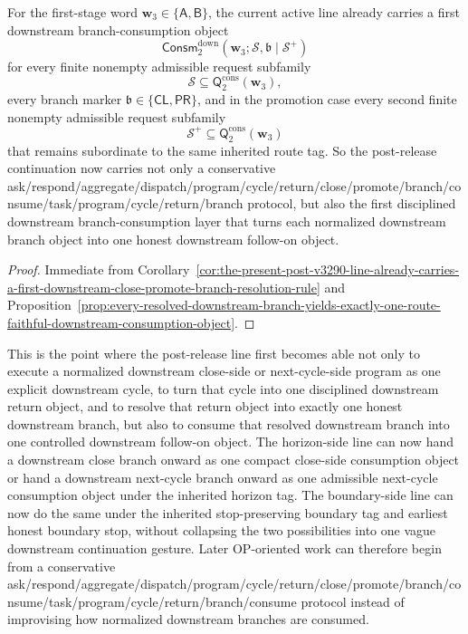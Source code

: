 \begin{corollary}
\label{cor:the-present-post-v3290-line-already-carries-a-first-downstream-branch-consumption-layer-second-level}
For the first-stage word \(\mathbf w_3\in\{\mathsf A,\mathsf B\}\), the current active line already carries a first downstream branch-consumption object
\[
  \mathsf{Consm}^{\mathrm{down}}_{2}(\mathbf w_3;\mathcal S,\mathfrak b\mid\mathcal S^{+})
\]
for every finite nonempty admissible request subfamily
\[
  \mathcal S\subseteq \mathsf{Q}^{\mathrm{cons}}_{2}(\mathbf w_3),
\]
every branch marker \(\mathfrak b\in\{\mathsf{CL},\mathsf{PR}\}\), and in the promotion case every second finite nonempty admissible request subfamily
\[
  \mathcal S^{+}\subseteq \mathsf{Q}^{\mathrm{cons}}_{2}(\mathbf w_3)
\]
that remains subordinate to the same inherited route tag. So the post-release continuation now carries not only a conservative ask/respond/aggregate/dispatch/program/cycle/return/close/promote/branch/consume/task/program/cycle/return/branch protocol, but also the first disciplined downstream branch-consumption layer that turns each normalized downstream branch object into one honest downstream follow-on object.
\end{corollary}

\begin{proof}
Immediate from Corollary~\ref{cor:the-present-post-v3290-line-already-carries-a-first-downstream-close-promote-branch-resolution-rule} and Proposition~\ref{prop:every-resolved-downstream-branch-yields-exactly-one-route-faithful-downstream-consumption-object}.
\end{proof}

\begin{remark}
\label{rem:what-the-first-downstream-branch-consumption-layer-now-buys-second-level}
This is the point where the post-release line first becomes able not only to execute a normalized downstream close-side or next-cycle-side program as one explicit downstream cycle, to turn that cycle into one disciplined downstream return object, and to resolve that return object into exactly one honest downstream branch, but also to consume that resolved downstream branch into one controlled downstream follow-on object. The horizon-side line can now hand a downstream close branch onward as one compact close-side consumption object or hand a downstream next-cycle branch onward as one admissible next-cycle consumption object under the inherited horizon tag. The boundary-side line can now do the same under the inherited stop-preserving boundary tag and earliest honest boundary stop, without collapsing the two possibilities into one vague downstream continuation gesture. Later OP-oriented work can therefore begin from a conservative ask/respond/aggregate/dispatch/program/cycle/return/close/promote/branch/consume/task/program/cycle/return/branch/consume protocol instead of improvising how normalized downstream branches are consumed.
\end{remark}


